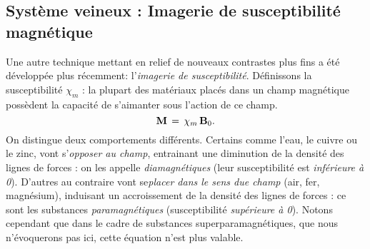 \subsection{Système veineux : Imagerie de susceptibilité magnétique}
\label{sec:QSM_chap_2}
Une autre technique mettant en relief de nouveaux contrastes plus fins a été développée plus récemment: l’{\em imagerie de susceptibilité}. Définissons la susceptibilité $\chi_m$ : la plupart des matériaux placés dans un champ magnétique possèdent la capacité de s’aimanter sous l’action de ce  champ. 
\begin{equation}
\bold{M}\,=\,\chi_m\,\bold{B}_0.
\end{equation}
On distingue deux comportements différents. Certains comme l’eau, le cuivre ou le zinc, vont s’{\em opposer au champ}, entrainant une diminution de la densité des lignes de forces : on les appelle {\em diamagnétiques} (leur susceptibilité est {\em inférieure à 0}). D’autres au contraire vont se{\em placer dans le sens due champ} (air, fer, magnésium), induisant un accroissement de la densité des lignes de forces : ce sont les substances {\em paramagnétiques} (susceptibilité {\em supérieure à 0}). Notons cependant que dans le cadre de substances superparamagnétiques, que nous n'évoquerons pas ici, cette équation n'est plus valable.

